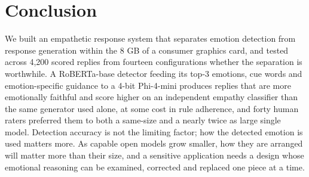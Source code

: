 \section{Conclusion}\label{sec:conclusion}
We built an empathetic response system that separates emotion detection from response generation within the 8 GB of a consumer graphics card, and tested across 4,200 scored replies from fourteen configurations whether the separation is worthwhile. A RoBERTa-base detector feeding its top-3 emotions, cue words and emotion-specific guidance to a 4-bit Phi-4-mini produces replies that are more emotionally faithful and score higher on an independent empathy classifier than the same generator used alone, at some cost in rule adherence, and forty human raters preferred them to both a same-size and a nearly twice as large single model. Detection accuracy is not the limiting factor; how the detected emotion is used matters more. As capable open models grow smaller, how they are arranged will matter more than their size, and a sensitive application needs a design whose emotional reasoning can be examined, corrected and replaced one piece at a time.
